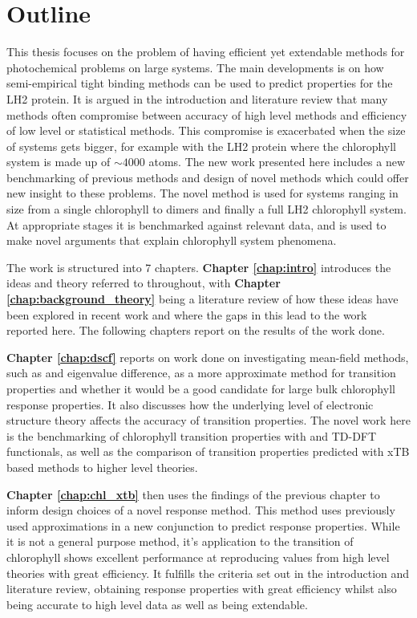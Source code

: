 %
%
\chapter{Outline}
\label{chap:outline}

This thesis focuses on the problem of having efficient yet extendable methods for
photochemical problems on large systems. The main developments is on how semi-empirical
tight binding methods can be used to predict properties for the LH2 protein. It 
is argued in the introduction and literature review that many methods often compromise
between accuracy of high level methods and efficiency of low level or statistical 
methods. This compromise is exacerbated when the size of systems gets bigger, for
example with the LH2 protein where the chlorophyll system is made up of $\sim 4000$
atoms. The new work presented here includes a new benchmarking of previous methods
and design of novel methods which could offer new insight to these problems. The
novel method is used for systems ranging in size from a single chlorophyll to dimers
and finally a full LH2 chlorophyll system. At appropriate stages it is benchmarked
against relevant data, and is used to make novel arguments that explain chlorophyll
system phenomena.

The work is structured into 7 chapters. \textbf{Chapter \ref{chap:intro}} introduces
the ideas and theory referred to throughout, with \textbf{Chapter \ref{chap:background_theory}} 
being a literature review of how these ideas have been explored in recent work and
where the gaps in this lead to the work reported here. The following chapters report
on the results of the work done.

\textbf{Chapter \ref{chap:dscf}} reports on work done on investigating
mean-field methods, such as \dscf and eigenvalue difference, as a more approximate
method for transition properties and whether it would be a good candidate for large
bulk chlorophyll response properties. It also discusses how the underlying level
of electronic structure theory affects the accuracy of transition properties. The
novel work here is the benchmarking of chlorophyll transition properties with \dscf
and TD-DFT functionals, as well as the comparison of transition properties predicted
with xTB based methods to higher level theories.

\textbf{Chapter \ref{chap:chl_xtb}} then uses the findings of the previous chapter to inform
design choices of a novel response method. This method uses previously used approximations
in a new conjunction to predict response properties. While it is not a general 
purpose method, it's application to the \Qy transition of chlorophyll shows excellent
performance at reproducing values from high level theories with great efficiency.
It fulfills the criteria set out in the introduction and literature review, obtaining
response properties with great efficiency whilst also being accurate to high level
data as well as being extendable.

